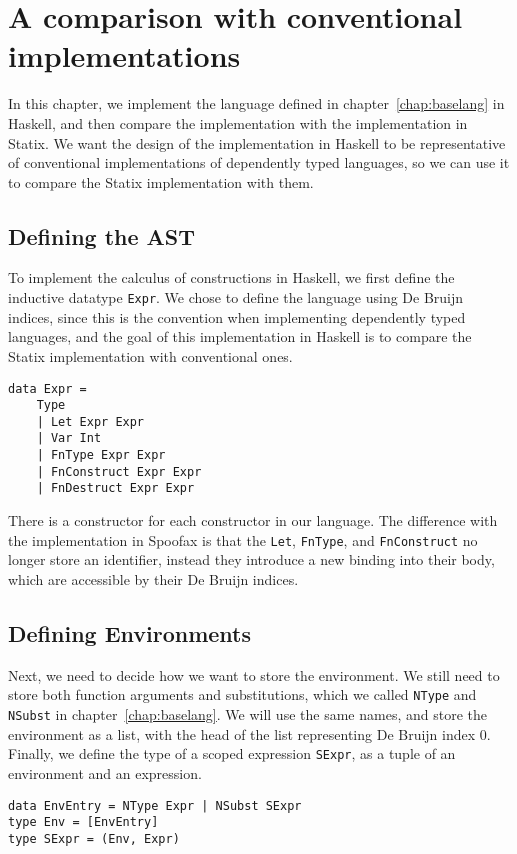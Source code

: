 \chapter{A comparison with conventional implementations}
\label{ch:comp-haskell}

In this chapter, we implement the language defined in chapter~\ref{chap:baselang} in Haskell, and then compare the implementation with the implementation in Statix. We want the design of the implementation in Haskell to be representative of conventional implementations of dependently typed languages, so we can use it to compare the Statix implementation with them.

\section{Defining the AST}
To implement the calculus of constructions in Haskell, we first define the inductive datatype \verb|Expr|. We chose to define the language using De Bruijn indices, since this is the convention when implementing dependently typed languages, and the goal of this implementation in Haskell is to compare the Statix implementation with conventional ones. 
\begin{lstlisting}
data Expr =
	Type
	| Let Expr Expr
	| Var Int
	| FnType Expr Expr
	| FnConstruct Expr Expr
	| FnDestruct Expr Expr
\end{lstlisting}
There is a constructor for each constructor in our language. The difference with the implementation in Spoofax is that the \verb|Let|, \verb|FnType|, and \verb|FnConstruct| no longer store an identifier, instead they introduce a new binding into their body, which are accessible by their De Bruijn indices. 

\section{Defining Environments}

Next, we need to decide how we want to store the environment. We still need to store both function arguments and substitutions, which we called \verb|NType| and \verb|NSubst| in chapter~\ref{chap:baselang}. We will use the same names, and store the environment as a list, with the head of the list representing De Bruijn index 0. Finally, we define the type of a scoped expression \verb|SExpr|, as a tuple of an environment and an expression.
\begin{lstlisting}
data EnvEntry = NType Expr | NSubst SExpr
type Env = [EnvEntry]
type SExpr = (Env, Expr)
\end{lstlisting}

